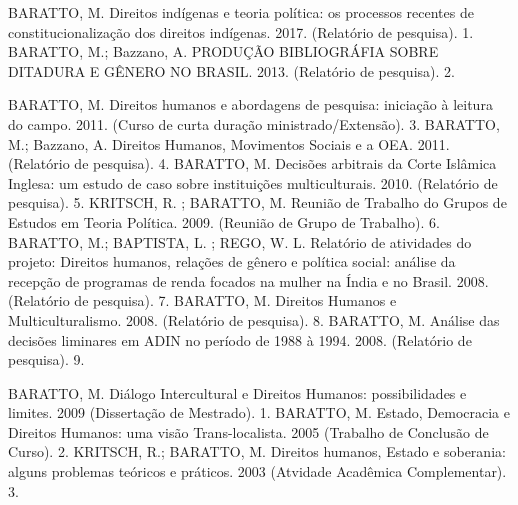 \begin{cvhonors}
  \cvhonor
    {BARATTO, M.}
    {Direitos indígenas e teoria política: os processos recentes de constitucionalização dos direitos indígenas. 2017. (Relatório de pesquisa).}
    {}
    {1. }
  \cvhonor
    {BARATTO, M.; Bazzano, A.}
    {PRODUÇÃO BIBLIOGRÁFIA SOBRE DITADURA E GÊNERO NO BRASIL. 2013. (Relatório de pesquisa).}
    {}
    {2. }
\end{cvhonors}
\begin{cvhonors}
  \cvhonor
    {BARATTO, M.}
    {Direitos humanos e abordagens de pesquisa: iniciação à leitura do campo. 2011. (Curso de curta duração ministrado/Extensão).}
    {}
    {3. }
  \cvhonor
    {BARATTO, M.; Bazzano, A.}
    {Direitos Humanos, Movimentos Sociais e a OEA. 2011. (Relatório de pesquisa).}
    {}
    {4. }
  \cvhonor
    {BARATTO, M.}
    {Decisões arbitrais da Corte Islâmica Inglesa: um estudo de caso sobre instituições multiculturais. 2010. (Relatório de pesquisa).}
    {}
    {5. }
  \cvhonor
    {KRITSCH, R. ; BARATTO, M.}
    {Reunião de Trabalho do Grupos de Estudos em Teoria Política. 2009. (Reunião de Grupo de Trabalho).}
    {}
    {6. }
  \cvhonor
    {BARATTO, M.; BAPTISTA, L. ; REGO, W. L.}
    {Relatório de atividades do projeto: Direitos humanos, relações de gênero e política social: análise da recepção de programas de renda focados na mulher na Índia e no Brasil. 2008. (Relatório de pesquisa).}
    {}
    {7. }
  \cvhonor
    {BARATTO, M.}
    {Direitos Humanos e Multiculturalismo. 2008. (Relatório de pesquisa).}
    {}
    {8. }
  \cvhonor
    {BARATTO, M.}
    {Análise das decisões liminares em ADIN no período de 1988 à 1994. 2008. (Relatório de pesquisa).}
    {}
    {9. }
\end{cvhonors}


\begin{cvhonors}
  \cvhonor
    {BARATTO, M.}
    {Diálogo Intercultural e Direitos Humanos: possibilidades e limites. 2009 (Dissertação de Mestrado).}
    {}
    {1. }
  \cvhonor
    {BARATTO, M.}
    {Estado, Democracia e Direitos Humanos: uma visão Trans-localista. 2005 (Trabalho de Conclusão de Curso).}
    {}
    {2. }
  \cvhonor
    {KRITSCH, R.; BARATTO, M.}
    {Direitos humanos, Estado e soberania: alguns problemas teóricos e práticos. 2003
    (Atvidade Acadêmica Complementar).}
    {}
    {3. }
\end{cvhonors}
